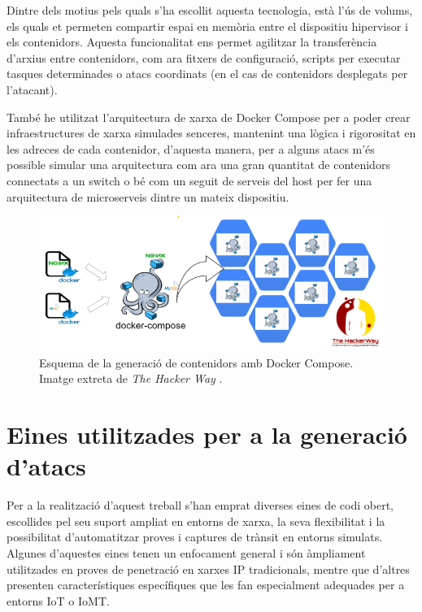  Dintre dels motius pels quals s’ha escollit aquesta tecnologia, està l’ús de volums, els quals et permeten compartir espai en memòria entre el dispositiu hipervisor i els contenidors. Aquesta funcionalitat ens permet agilitzar la transferència d’arxius entre contenidors, com ara fitxers de configuració, scripts per executar tasques determinades o atacs coordinats (en el cas de contenidors desplegats per l’atacant).

  També he utilitzat l’arquitectura de xarxa de Docker Compose per a poder crear infraestructures de xarxa simulades senceres, mantenint una lògica i rigorositat en les adreces de cada contenidor, d’aquesta manera, per a alguns atacs m’és possible simular una arquitectura com ara una gran quantitat de contenidors connectats a un switch o bé com un seguit de serveis del host per fer una arquitectura de microserveis dintre un mateix dispositiu.

  \begin{figure}[H]
    \centering
    \includegraphics[width=1\textwidth]{img/DockerFig.png}
    \caption{Esquema de la generació de contenidors amb Docker Compose. Imatge extreta de \textit{The Hacker Way} \cite{miottaupcfig}.}
    \label{fig:MQTT2}
  \end{figure}




\section{Eines utilitzades per a la generació d'atacs}
\label{sec:Eines}
  Per a la realització d’aquest treball s’han emprat diverses eines de codi obert, escollides pel seu suport ampliat en entorns de xarxa, la seva ﬂexibilitat i la possibilitat d’automatitzar proves i captures de trànsit en entorns simulats. Algunes d’aquestes eines tenen un enfocament general i són àmpliament utilitzades en proves de penetració en xarxes IP tradicionals, mentre que d’altres presenten característiques especíﬁques que les fan especialment adequades per a entorns IoT o IoMT.

